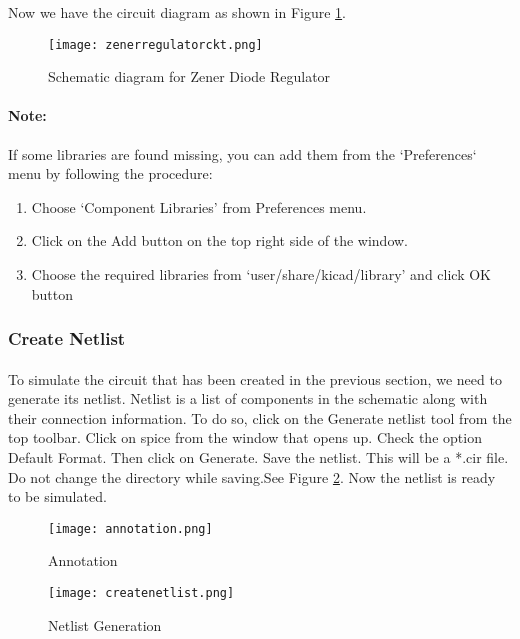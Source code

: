 Now we have the circuit diagram as shown in Figure \ref{zenerregulatorckt}.
\begin{figure}[]
\centering
\texttt{[image: zenerregulatorckt.png]}
\caption{Schematic diagram for Zener Diode Regulator}
\label{zenerregulatorckt}
\end{figure}

\paragraph{Note:} If some libraries are found missing, you can add them from the `Preferences` menu by following the procedure: 

\begin{enumerate}
\item
Choose `Component Libraries' from Preferences menu.

\item
Click on the Add button on the top right side of the window.

\item
Choose the required libraries from `user/share/kicad/library' and click OK button

\end{enumerate}

\subsubsection{Create Netlist}

\paragraph{}To simulate the circuit that has been created in the previous section, we need to generate
its netlist. Netlist is a list of components in the schematic along with their connection
information. To do so, click on the Generate netlist tool from the top toolbar. Click on
spice from the window that opens up. Check the option Default Format. Then click
on Generate. Save the netlist. This will be a *.cir file. Do
not change the directory while saving.See Figure \ref{createnetlist}.
 Now the netlist is ready to be simulated. 
\begin{figure}
\begin{minipage}{.5\textwidth}
  \centering
  \texttt{[image: annotation.png]}
  \caption{Annotation}
  \label{annotation}
\end{minipage}%
\begin{minipage}{.5\textwidth}
  \centering
  \texttt{[image: createnetlist.png]}
  \caption{Netlist Generation}
  \label{createnetlist}
\end{minipage}
\end{figure}

